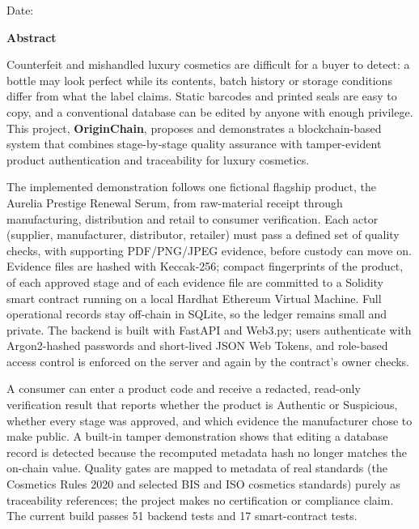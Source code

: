 \documentclass[12pt,a4paper]{report}
\begin{document}
\vspace{0.6cm}
\noindent Date:\par
\newpage
\thispagestyle{plain}
\begin{center}
    {\Large \textbf{Abstract}\par}
\end{center}
\vspace{0.25cm}
{\small{}\setlength{\parindent}{0pt}\setlength{\parskip}{5pt}
Counterfeit and mishandled luxury cosmetics are difficult for a buyer to detect: a bottle may look perfect while its contents, batch history or storage conditions differ from what the label claims. Static barcodes and printed seals are easy to copy, and a conventional database can be edited by anyone with enough privilege. This project, \textbf{OriginChain}, proposes and demonstrates a blockchain-based system that combines stage-by-stage quality assurance with tamper-evident product authentication and traceability for luxury cosmetics.

The implemented demonstration follows one fictional flagship product, the Aurelia Prestige Renewal Serum, from raw-material receipt through manufacturing, distribution and retail to consumer verification. Each actor (supplier, manufacturer, distributor, retailer) must pass a defined set of quality checks, with supporting PDF/PNG/JPEG evidence, before custody can move on. Evidence files are hashed with Keccak-256; compact fingerprints of the product, of each approved stage and of each evidence file are committed to a Solidity smart contract running on a local Hardhat Ethereum Virtual Machine. Full operational records stay off-chain in SQLite, so the ledger remains small and private. The backend is built with FastAPI and Web3.py; users authenticate with Argon2-hashed passwords and short-lived JSON Web Tokens, and role-based access control is enforced on the server and again by the contract's owner checks.

A consumer can enter a product code and receive a redacted, read-only verification result that reports whether the product is Authentic or Suspicious, whether every stage was approved, and which evidence the manufacturer chose to make public. A built-in tamper demonstration shows that editing a database record is detected because the recomputed metadata hash no longer matches the on-chain value. Quality gates are mapped to metadata of real standards (the Cosmetics Rules 2020 and selected BIS and ISO cosmetics standards) purely as traceability references; the project makes no certification or compliance claim. The current build passes 51 backend tests and 17 smart-contract tests.

}
\end{document}
